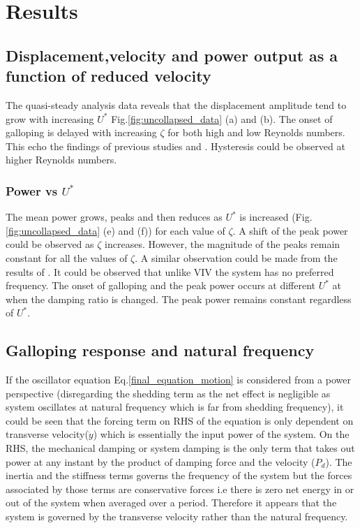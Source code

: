 
\section{Results}


\subsection{Displacement,velocity and power output as a function of reduced velocity}


 The quasi-steady analysis data reveals that the displacement amplitude tend to grow with increasing $U^*$ Fig.\ref{fig:uncollapsed_data} (a) and (b). The onset of galloping is delayed with increasing $\zeta$ for both high and low Reynolds numbers. This echo the findings of previous studies \cite{Parkinson1964} and \cite{Barrero-Gil2010a}. Hysteresis could be observed at higher Reynolds numbers. 

 
 \subsubsection*{Power vs $U^*$}
 
 The mean power grows, peaks and then reduces as $U^*$ is increased (Fig.\ref{fig:uncollapsed_data} (e) and (f)) for each value of $\zeta$. A shift of the peak power could be observed as $\zeta$ increases. However, the magnitude of the peaks remain constant for all the values of $\zeta$. A similar observation could be made from the results of \cite{Barrero-Gil2010a}. It could be observed that unlike VIV the  system has no preferred frequency. The onset of galloping and the peak power occurs at different $U^*$ at when the damping ratio is changed. The peak power remains constant regardless of $U^*$.
 
 \subsection{Galloping response and natural frequency}
 
 If the oscillator equation Eq.\eqref{final_equation_motion} is considered from a power perspective (disregarding the shedding term as the net effect is negligible as system oscillates at natural frequency which is far from shedding frequency), it could be seen that the forcing term on RHS of the equation is only dependent on transverse velocity($\dot{y}$) which is essentially the input power of the system. On the RHS, the mechanical damping or system damping is the only term that takes out power at any instant by the product of damping force and the velocity ($P_d$). The inertia and the stiffness terms governs the frequency of the system but the forces associated by those terms are conservative forces i.e there is zero net energy in or out of the system when averaged over a period. Therefore it appears that the system is governed by the transverse velocity rather than the natural frequency.
 

